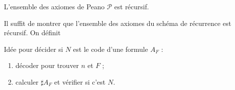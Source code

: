 \documentclass[./main]{subfiles}
\begin{document}
 \begin{lem}
   L'ensemble des axiomes de Peano $\mathcal{P}$ est récursif.
 \end{lem}
 \begin{prv}
   Il suffit de montrer que l'ensemble des axiomes du schéma de récurrence est récursif.
   On définit


  Idée pour décider si $N$ est le code d'une formule $A_F$ : 
  \begin{enumerate}
    \item décoder pour trouver $n$ et $F$ ;
    \item calculer $\sharp A_F$ et vérifier si c'est $N$.
  \end{enumerate}
 \end{prv}
\end{document}
